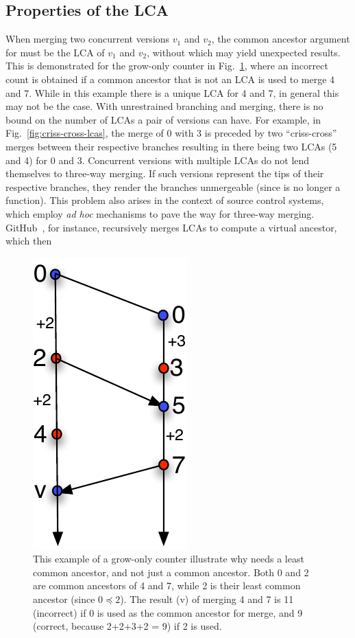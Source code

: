 \subsection{Properties of the LCA}
\label{sec:meta}

When merging two concurrent versions $v_1$ and $v_2$, the common
ancestor argument for  must be the LCA of $v_1$ and $v_2$,
without which  may yield unexpected results. This is
demonstrated for the grow-only counter in
Fig.~\ref{fig:merge-needs-lca}, where an incorrect count is obtained if a
common ancestor that is not an LCA is used to merge 4 and 7. While in
this example there is a unique LCA for 4 and 7, in general this may
not be the case. With unrestrained branching and merging, there is no
bound on the number of LCAs a pair of versions can have.  For example,
in Fig.~\ref{fig:criss-cross-lcas}, the merge of 0 with 3 is preceded
by two ``criss-cross'' merges between their respective branches
resulting in there being two LCAs (5 and 4) for 0 and 3.
Concurrent versions with multiple LCAs do not lend themselves to
three-way merging. If such versions represent the tips of their respective
branches, they render the branches unmergeable (since   is no
longer a function). This problem also arises in the context of source
control systems, which employ \emph{ad hoc} mechanisms to pave the way
for three-way merging.  GitHub~\cite{github}, for instance,
recursively merges LCAs to compute a virtual ancestor, which then
\begin{figure}
\centering
\includegraphics[scale=0.45]{Figures/merge-needs-lca}
\caption{This example of a grow-only counter illustrate why 
needs a least common ancestor, and not just a common ancestor. Both 0
and 2 are common ancestors of 4 and 7, while 2 is their least common
ancestor (since $0 \preceq 2$). The result (v) of merging 4 and 7 is
11 (incorrect) if 0 is used as the common ancestor for merge, and 9
(correct, because 2+2+3+2 = 9) if 2 is used. }
\label{fig:merge-needs-lca}
\end{figure}
